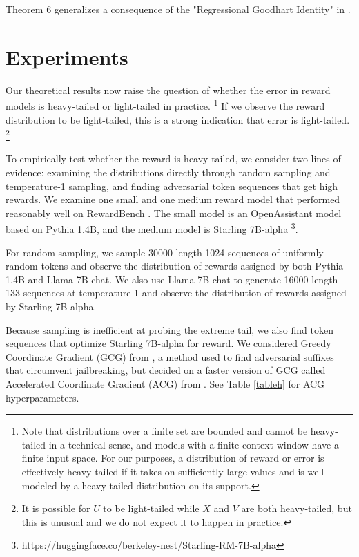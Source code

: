 \documentclass{article}
\begin{document}
Theorem 6 generalizes a consequence of the "Regressional Goodhart Identity" in \citep{gao2023scaling}.

\section{Experiments}

Our theoretical results now raise the question of whether the error in reward models is heavy-tailed or light-tailed in practice. \footnote{Note that distributions over a finite set are bounded and cannot be heavy-tailed in a technical sense, and models with a finite context window have a finite input space. For our purposes, a distribution of reward or error is effectively heavy-tailed if it takes on sufficiently large values and is well-modeled by a heavy-tailed distribution on its support.} If we observe the reward distribution to be light-tailed, this is a strong indication that error is light-tailed. \footnote{It is possible for $U$ to be light-tailed while $X$ and $V$ are both heavy-tailed, but this is unusual and we do not expect it to happen in practice.}

To empirically test whether the reward is heavy-tailed, we consider two lines of evidence: examining the distributions directly through random sampling and temperature-1 sampling, and finding adversarial token sequences that get high rewards. We examine one small and one medium reward model that performed reasonably well on RewardBench \citep{lambert2023rewardbench}. The small model is an OpenAssistant model based on Pythia 1.4B, and the medium model is Starling 7B-alpha \citep{starling2023}\footnote{https://huggingface.co/berkeley-nest/Starling-RM-7B-alpha}.

For random sampling, we sample 30000 length-1024 sequences of uniformly random tokens and observe the distribution of rewards assigned by both Pythia 1.4B and Llama 7B-chat. We also use Llama 7B-chat to generate 16000 length-133 sequences at temperature 1 and observe the distribution of rewards assigned by Starling 7B-alpha.

Because sampling is inefficient at probing the extreme tail, we also find token sequences that optimize Starling 7B-alpha for reward. We considered Greedy Coordinate Gradient (GCG) from \citep{zou2023universal}, a method used to find adversarial suffixes that circumvent jailbreaking, but decided on a faster version of GCG called Accelerated Coordinate Gradient (ACG) from \citep{haizelabs2024acg}. See Table \ref{tableh} for ACG hyperparameters.
\end{document}
